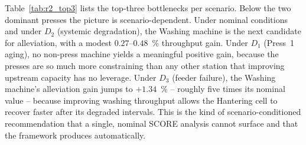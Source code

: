 \documentclass[a4paper,fleqn]{cas-sc}
\begin{document}
  Table~\ref{tab:r2_top3} lists the top-three bottlenecks per scenario.                                                                     
  Below the two dominant presses the picture is scenario-dependent. Under                                                                   
  nominal conditions and under $D_2$ (systemic degradation), the Washing                                                                    
  machine is the next candidate for alleviation, with a modest                                                                              
  $0.27$--$0.48$~\% throughput gain. Under $D_1$ (Press~1 aging), no                                                                        
  non-press machine yields a meaningful positive gain, because the presses                                                                  
  are so much more constraining than any other station that improving                                                                       
  upstream capacity has no leverage. Under $D_3$ (feeder failure), the                                                                      
  Washing machine's alleviation gain jumps to $+1.34$~\% -- roughly five                                                                    
  times its nominal value -- because improving washing throughput allows                                                                    
  the Hantering cell to recover faster after its degraded intervals.                                                                        
  This is the kind of scenario-conditioned recommendation that a single,                                                                    
  nominal SCORE analysis cannot surface and that the framework produces                                                                     
  automatically.                                                                                                                            
                                                                                                                                            
\end{document}
